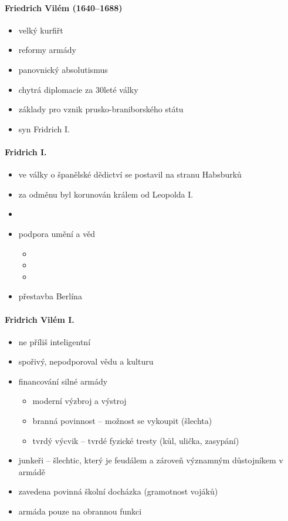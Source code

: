 \paragraph{Friedrich Vilém (1640--1688)}
\begin{itemize}
\item velký kurfiřt 
\item reformy armády
\item panovnický absolutismus
\item chytrá diplomacie za 30leté války
\item základy pro vznik prusko-braniborského státu
\item syn Fridrich I.
\end{itemize}

\paragraph{Fridrich I.}
\begin{itemize}
\item ve války o španělské dědictví se postavil na stranu Habsburků
\item za odměnu byl korunován králem od Leopolda I.
\item {}
\item podpora umění a věd
	\begin{itemize}
	\item {}
	\item {}
	\item {}
	\end{itemize}
\item přestavba Berlína
\end{itemize}

\paragraph{Fridrich Vilém I.}
\begin{itemize}
\item ne příliš inteligentní
\item spořivý, nepodporoval vědu a kulturu
\item financování silné armády
	\begin{itemize}
	\item moderní výzbroj a výstroj
	\item branná povinnost -- možnost se vykoupit (šlechta)
	\item tvrdý výcvik -- tvrdé fyzické tresty (kůl, ulička, zasypání)
	\end{itemize}
\item junkeři -- šlechtic, který je feudálem a zároveň významným důstojníkem v armádě
\item zavedena povinná školní docházka (gramotnost vojáků)
\item armáda pouze na obrannou funkci
\end{itemize}

